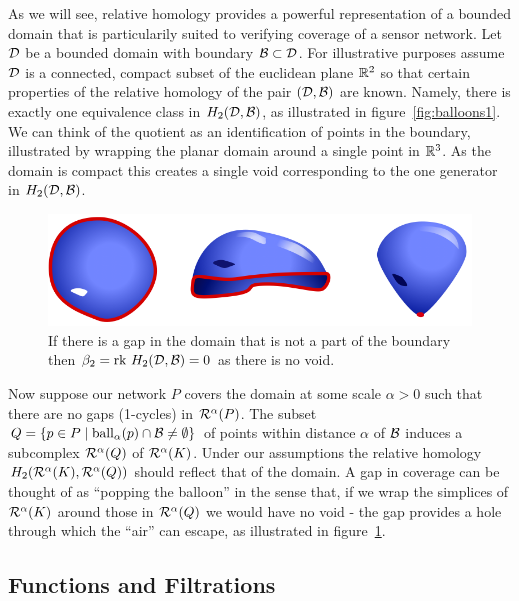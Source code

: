 As we will see, relative homology provides a powerful representation of a bounded domain that is particularily suited to verifying coverage of a sensor network.
Let ${\mathcal{D}}$ be a bounded domain with boundary ${\mathcal{B}}\subset{\mathcal{D}}$.
For illustrative purposes assume ${\mathcal{D}}$ is a connected, compact subset of the euclidean plane $\mathbb{R}^2$ so that certain properties of the relative homology of the pair $({\mathcal{D}}, {\mathcal{B}})$ are known.
Namely, there is exactly one equivalence class in $H_2({\mathcal{D}}, {\mathcal{B}})$, as illustrated in figure~\ref{fig:balloons1}.
We can think of the quotient as an identification of points in the boundary, illustrated by wrapping the planar domain around a single point in $\mathbb{R}^3$.
As the domain is compact this creates a single void corresponding to the one generator in $H_2({\mathcal{D}}, {\mathcal{B}})$.

\begin{figure}[htbp]
\centering
    \includegraphics[scale=0.5]{figures/balloons2.png}
    \caption{If there is a gap in the domain that is not a part of the boundary then $\beta_2 = \mathrm{rk}~ H_2({\mathcal{D}}, {\mathcal{B}}) = 0$ as there is no void.}
    \label{fig:balloons2}
\end{figure}

Now suppose our network $P$ covers the domain at some scale $\alpha > 0$ such that there are no gaps (1-cycles) in $\mathcal{R}^\alpha(P)$.
The subset $Q = \{p\in P\mid \mathrm{ball}_\alpha(p)\cap{\mathcal{B}}\neq\emptyset\}$ of points within distance $\alpha$ of ${\mathcal{B}}$ induces a subcomplex $\mathcal{R}^\alpha(Q)$ of $\mathcal{R}^\alpha(K)$.
Under our assumptions the relative homology $H_2(\mathcal{R}^\alpha(K), \mathcal{R}^\alpha(Q))$ should reflect that of the domain.
A gap in coverage can be thought of as ``popping the balloon'' in the sense that, if we wrap the simplices of $\mathcal{R}^\alpha(K)$ around those in $\mathcal{R}^\alpha(Q)$ we would have no void - the gap provides a hole through which the ``air'' can escape, as illustrated in figure~\ref{fig:balloons2}.

\subsection{Functions and Filtrations}

